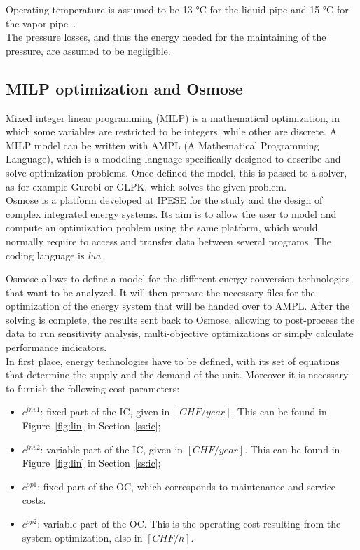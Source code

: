 \documentclass{article}
\begin{document}
Operating temperature is assumed to be 13 \si{\celsius} for the liquid pipe and 15 \si{\celsius} for the vapor pipe~\cite{suciuEnergyautonomousCitiesUsing2016}.\\

The pressure losses, and thus the energy needed for the maintaining of the pressure, are assumed to be negligible.

\subsection{MILP optimization and Osmose}\label{ss:osmose}

Mixed integer linear programming (MILP) is a mathematical optimization, in which some variables are restricted to be integers, while other are discrete. A MILP model can be written with AMPL (A Mathematical Programming Language), which is a modeling language specifically designed to describe and solve optimization problems. Once defined the model, this is passed to a solver, as for example Gurobi or GLPK, which solves the given problem.\\

Osmose is a platform developed at IPESE for the study and the design of complex integrated energy systems. Its aim is to allow the user to model and compute an optimization problem using the same platform, which would normally require to access and transfer data between several programs. The coding language is \textit{lua}.

Osmose allows to define a model for the different energy conversion technologies that want to be analyzed. It will then prepare the necessary files for the optimization of the energy system that will be handed over to AMPL. After the solving is complete, the results sent back to Osmose, allowing to post-process the data to run sensitivity analysis, multi-objective optimizations or simply calculate performance indicators.\\

In first place, energy technologies have to be defined, with its set of equations that determine the supply and the demand of the unit. Moreover it is necessary to furnish the following cost parameters:
\begin{itemize}
	\item $c^{inv1}$: fixed part of the IC, given in $[CHF/year]$. This can be found in Figure~\ref{fig:lin} in Section~\ref{ss:ic};
	\item $c^{inv2}$: variable part of the IC, given in $[CHF/year]$. This can be found in Figure~\ref{fig:lin} in Section~\ref{ss:ic};
	\item $c^{op1}$: fixed part of the OC, which corresponds to maintenance and service costs. 
	\item $c^{op2}$: variable part of the OC. This is the operating cost resulting from the system optimization, also in $[CHF/h]$.
\end{itemize}
\end{document}
